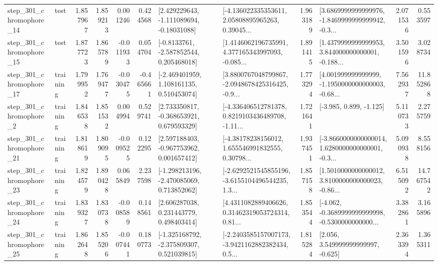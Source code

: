 \begin{tabular}{llrrrrllrlrr}
  step\_301\_chromophore\_14 &      test &      1.857967 &    1.859213 &      0.001246 &  0.424568 &    [2.429229643, -1.111089694, -0.18031088] &  [-4.136022335353611, 2.05808895965263, 0.39045... &       1.963189 &  [3.6869999999999976, -1.8469999999999942, -0.3... &            2.071536 &          0.553597 \\
  step\_301\_chromophore\_15 &      test &      1.877723 &    1.865789 &     -0.011933 &  0.054704 &     [-0.8133761, -2.587852544, 0.205468018] &  [1.4146062196735991, 4.377165343997093, -0.085... &       1.891415 &  [1.4379999999999953, 3.844000000000001, -0.188... &            3.501596 &          3.028734 \\
  step\_301\_chromophore\_17 &  training &      1.799952 &    1.769477 &     -0.030475 & -0.465661 &    [-2.469401959, 1.108161135, 0.510453074] &  [3.8800767048799867, -2.0948678425316425, -0.9... &       1.773294 &  [4.001999999999999, -1.1950000000000003, -0.68... &            7.562937 &         11.852868 \\
   step\_301\_chromophore\_2 &  training &      1.846538 &    1.851532 &      0.004994 &  0.529741 &    [2.733350817, -0.368653921, 0.679593329] &  [-4.336406512781378, 0.8219103436489708, -1.11... &       1.721641 &                            [-3.985, 0.899, -1.125] &            5.110733 &          2.275759 \\
  step\_301\_chromophore\_21 &  training &      1.818619 &    1.809095 &     -0.009525 &  0.122295 &    [2.597188403, -0.967753962, 0.001657412] &  [-4.38178238156012, 1.655546991832555, 0.30798... &       1.937451 &  [-3.8660000000000014, 1.6280000000000001, -0.3... &            5.090938 &          8.558156 \\
  step\_301\_chromophore\_23 &  training &      1.824579 &    1.890428 &      0.065849 &  2.237598 &   [-1.298213196, -2.470085069, 0.713852062] &  [-2.6292521545855196, -3.6155104496544235, 1.3... &       1.857158 &  [1.5010000000000012, 3.8100000000000023, -0.86... &            6.515092 &         14.767542 \\
  step\_301\_chromophore\_24 &  training &      1.839327 &    1.830738 &     -0.008589 &  0.148561 &     [2.606287038, 0.231443779, 0.498403414] &  [4.4311082889406626, 0.31462319053724314, 0.81... &       1.853544 &  [-4.062, -0.3689999999999998, -0.5300000000000... &            3.382861 &          3.165896 \\
  step\_301\_chromophore\_25 &  training &      1.862648 &    1.855206 &     -0.007441 &  0.180773 &   [-1.325168792, -2.375809307, 0.521039815] &  [-2.2403585157007173, -3.9421162882382434, 0.5... &       1.815284 &                 [2.056, 3.549999999999997, -0.625] &            2.363394 &          1.365311 \\

\end{tabular}

